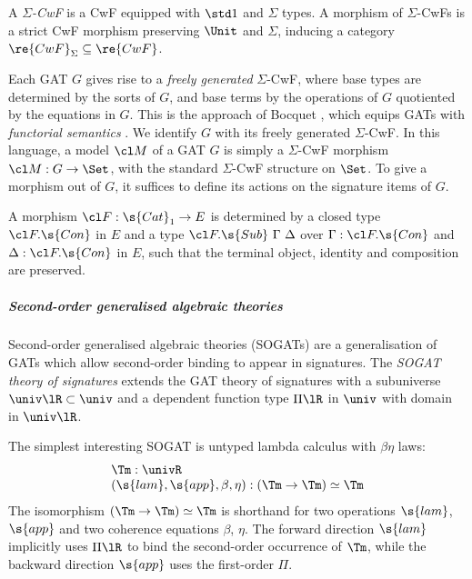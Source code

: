\documentclass[a4paper,UKenglish,cleveref,autoref,thm-restate]{lipics-v2021}
\begin{document}
\begin{definition}
A \emph{$\Sigma$-CwF}\label{def:sigma-cwf} is a CwF
equipped with $\std 1$ and $\Sigma$ types. A morphism of $\Sigma$-CwFs is a
strict CwF morphism preserving $\Unit$ and $\Sigma$, inducing a category
$\re{CwF}_{\Sigma} \subseteq \re{CwF}$.
\end{definition}

Each GAT $G$ gives rise to a \emph{freely generated} $\Sigma$-CwF, where base
types are determined by the sorts of $G$, and base terms by the operations of
$G$ quotiented by the equations in $G$. This is the approach of Bocquet
\cite{Bocquet2025-ox}, which equips GATs with \emph{functorial semantics}
\cite{Lawvere1963-qd}. We identify $G$ with its freely generated $\Sigma$-CwF.
In this language, a model\label{def:gat-model} $\cl M$ of a GAT $G$ is simply a
$\Sigma$-CwF morphism $\cl M : G \to \Set$, with the standard $\Sigma$-CwF
structure on $\Set$. To give a morphism out of $G$, it suffices to define its
actions on the signature items of $G$.

\begin{example}
A morphism $\cl F : \s{Cat}_1 \to E$ is determined by a closed type $\cl
F.\s{Con}$ in $E$ and a type $\cl F.\s{Sub}\ \Gamma\ \Delta$ over $\Gamma : \cl
F.\s{Con}$ and $\Delta : \cl F.\s{Con}$ in $E$, such that the terminal object,
identity and composition are preserved.
\end{example}

\subparagraph{Second-order generalised algebraic theories}

Second-order generalised algebraic theories (SOGATs) \cite{Uemura2021-jq,Bocquet2025-ox} are a generalisation of
GATs which allow second-order binding to appear in signatures. The \emph{SOGAT
theory of signatures} extends the GAT theory of signatures with a subuniverse
$\univ\lR \subset \univ$ and a dependent function type $\Pi\lR$ in $\univ$ with
domain in $\univ\lR$.

\begin{example}
The simplest interesting SOGAT is untyped lambda calculus with $\beta\eta$ laws:
\begin{equation}\label{eq:lc-sogat}\begin{array}{l}
  \Tm : \univR \\
  (\s{lam}, \s{app}, \beta, \eta) : (\Tm \to \Tm) \simeq \Tm \end{array}
\end{equation}
The isomorphism $(\Tm \to \Tm) \simeq \Tm$ is shorthand for two operations
$\s{lam}$, $\s{app}$ and two coherence equations $\beta$, $\eta$. The forward
direction $\s{lam}$ implicitly uses $\Pi\lR$ to bind the second-order occurrence
of $\Tm$, while the backward direction $\s{app}$ uses the first-order $\Pi$.
\end{example}
\end{document}
